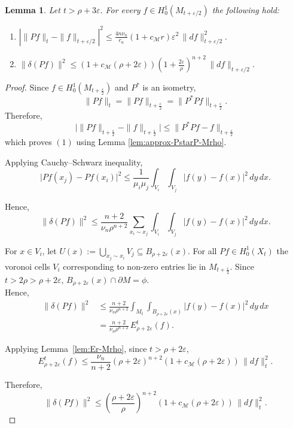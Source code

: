 \documentclass[10 pt, reqno]{amsart}
\newcommand{\M}{\mathcal{M}}
\newtheorem{lemma}[theorem]{Lemma}
\theoremstyle{definition}
\numberwithin{equation}{section}
\newcommand{\MMM}{\mathcal{M}}
\begin{document}
\begin{lemma}\label{lem:Pf-estimates-Mrho}
Let $t>\rho+3\varepsilon.$ For every $f\in H^1_0(M_{t+\varepsilon/2})$ the following hold:
\begin{enumerate}
\item $
 |
\|Pf\|_{t} - \|f\|_{t+\varepsilon/2}|^2
\le
\frac{4n\nu_{n}}{c_n } (1+c_\MMM r)\varepsilon^2\,\|df\|_{t+\varepsilon/2}^2. $

\item $
\|\delta(Pf)\|^2
\le
(1+c_\MMM (\rho+2\varepsilon))\left(1+\frac{2\varepsilon}{\rho}\right)^{n+2}\,\|d f\|_{t+\varepsilon/2}$.
 

\end{enumerate}
\end{lemma}
\begin{proof}
Since $f\in H^1_0(M_{t+\frac{\varepsilon}{2}})$ and $P^*$ is an isometry,
\[
\|Pf\|_{t} =\|Pf\|_{t+\frac{\varepsilon}{2}}= \|P^*Pf\|_{{t+\frac{\varepsilon}{2}}}.
\]
Therefore, 
\[
\big|\|Pf\|_{t+\frac{\varepsilon}{2}} - \|f\|_{t+\frac{\varepsilon}{2}}\big|\le \|P^*Pf-f\|_{t+\frac{\varepsilon}{2}}
\]
which proves $(1)$ using Lemma \ref{lem:approx-PstarP-Mrho}.



Applying Cauchy--Schwarz inequality,
\[
\big|Pf(x_j)-Pf(x_i)\big|^2
\le
\frac{1}{\mu_i\mu_j}
\int_{V_i}\int_{V_j}
|f(y)-f(x)|^2\,dy\,dx.
\]

Hence,
\[
\|\delta(Pf)\|^2
\le
\frac{n+2}{\nu_n\rho^{n+2}}
\sum_{x_i\sim x_j}
\int_{V_i}\int_{V_j}
|f(y)-f(x)|^2\,dy\,dx.
\]

For $x\in V_i$,  let $U(x):=\bigcup_{x_j\sim x_i} V_j
\subseteq B_{\rho+2\varepsilon}(x).$
For all $Pf\in H^1_0(X_{t})$ the voronoi cells $V_i$ corresponding to non-zero entries lie in $M_{t+\frac{\varepsilon}{2}}.$ Since $t>2\rho>\rho+2\varepsilon$, $B_{\rho+2\varepsilon}(x)\cap\partial M=\phi.$ \\Hence,
\begin{align*}
   \|\delta(Pf)\|^2
&\le
\frac{n+2}{\nu_n\rho^{n+2}}
\int_{M_{t}}
\int_{B_{\rho+2\varepsilon}(x)}
|f(y)-f(x)|^2\,dy\,dx \\
&=
\frac{n+2}{\nu_n\rho^{n+2}}\,E^{t}_{\rho+2\varepsilon}(f). 
\end{align*}


Applying Lemma~\ref{lem:Er-Mrho}, since $t>\rho+2\varepsilon$,
\[
E^t_{\rho+2\varepsilon}(f)
\le
\frac{\nu_n}{n+2}
(\rho+2\varepsilon)^{n+2}
(1+c_\M (\rho+2\varepsilon))\,\|d f\|_{{t}}^2.
\]

Therefore,
\[
\|\delta(Pf)\|^2
\le
\left(\frac{\rho+2\varepsilon}{\rho}\right)^{n+2}
(1+c_\M (\rho+2\varepsilon))\,\|d f\|_t^2.
\]

\end{proof}
\end{document}
